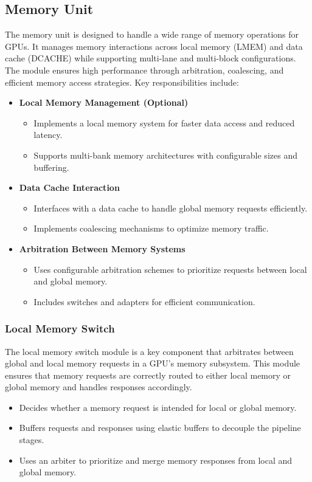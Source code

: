 \documentclass[12pt]{report}
\begin{document}
\subsection{Memory Unit}
The memory unit is designed to handle a wide range of memory operations for GPUs. It manages memory interactions across local memory (LMEM) and data cache (DCACHE) while supporting multi-lane and multi-block configurations. The module ensures high performance through arbitration, coalescing, and efficient memory access strategies. Key responsibilities include:
\begin{itemize}
    \item \textbf{Local Memory Management (Optional)}
        \begin{itemize}
            \item Implements a local memory system for faster data access and reduced latency.
            \item Supports multi-bank memory architectures with configurable sizes and buffering.
        \end{itemize}
    \item \textbf{Data Cache Interaction}
        \begin{itemize}
            \item Interfaces with a data cache to handle global memory requests efficiently.
            \item Implements coalescing mechanisms to optimize memory traffic.
        \end{itemize}
    \item \textbf{Arbitration Between Memory Systems}
        \begin{itemize}
            \item Uses configurable arbitration schemes to prioritize requests between local and global memory.
            \item Includes switches and adapters for efficient communication.
        \end{itemize}
\end{itemize}

\subsubsection{Local Memory Switch}
The local memory switch module is a key component that arbitrates between global and local memory requests in a GPU's memory subsystem. This module ensures that memory requests are correctly routed to either local memory or global memory and handles responses accordingly.
\begin{itemize}
    \item Decides whether a memory request is intended for local or global memory. 
    \item Buffers requests and responses using elastic buffers to decouple the pipeline stages.
    \item Uses an arbiter to prioritize and merge memory responses from local and global memory.
\end{itemize}
\end{document}
